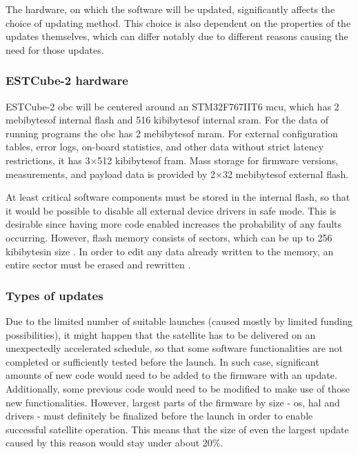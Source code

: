 The hardware, on which the software will be updated, significantly affects the choice of updating method. This choice is also dependent on the properties of the updates themselves, which can differ notably due to different reasons causing the need for those updates.

\subsubsection{ESTCube-2 hardware}\label{s:hardware}

ESTCube-2 \gls{obc} will be centered around an STM32F767IIT6 \gls{mcu}, which has 2 mebibytes\footnotemark of internal flash and 516 kibibytes\footnotemark[\value{footnote}] of internal \gls{sram}. For the data of running programs the \gls{obc} has 2 mebibytes\footnotemark[\value{footnote}] of \gls{mram}. For external configuration tables, error logs, on-board statistics, and other data without strict latency restrictions, it has 3$\times$512 kibibytes\footnotemark[\value{footnote}] of \gls{fram}. Mass storage for firmware versions, measurements, and payload data is provided by 2$\times$32 mebibytes\footnotemark[\value{footnote}] of external flash.
\cite{Haljaste2017}

At least critical software components must be stored in the internal flash, so that it would be possible to disable all external device drivers in safe mode. This is desirable since having more code enabled increases the probability of any faults occurring. However, flash memory consists of sectors, which can be up to 256 kibibytes\footnotemark[\value{footnote}] in size \cite{STMicroelectronics2018}. In order to edit any data already written to the memory, an entire sector must be erased and rewritten \cite{STMicroelectronics2018}.


\subsubsection{Types of updates}

Due to the limited number of suitable launches (caused mostly by limited funding possibilities), it might happen that the satellite has to be delivered on an unexpectedly accelerated schedule, so that some software functionalities are not completed or sufficiently tested before the launch. In such case, significant amounts of new code would need to be added to the firmware with an update. Additionally, some previous code would need to be modified to make use of those new functionalities. However, largest parts of the firmware by size - \gls{os}, \gls{hal} and drivers - must definitely be finalized before the launch in order to enable successful satellite operation. This means that the size of even the largest update caused by this reason would stay under about 20\%.

